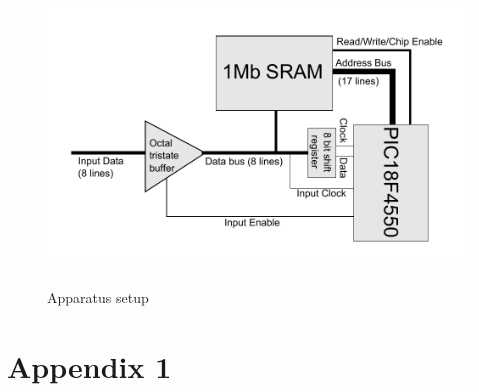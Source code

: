 \documentclass[11pt]{article}
\begin{document}
    \begin{figure}
    \centering
    \includegraphics[height=8cm]{block_diagram.pdf}
    \caption{Apparatus setup}
    \label{fig:app}
    \end{figure}
	
\appendix
\appendixpage
\addappheadtotoc
\section{Appendix 1}
			
\end{document}
